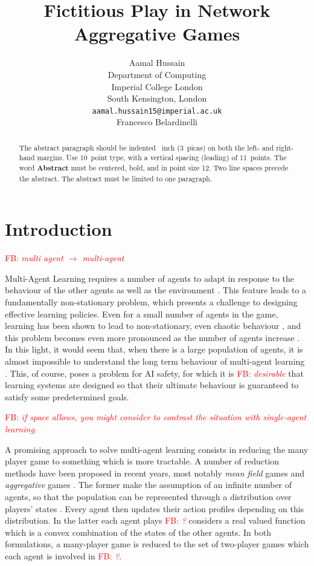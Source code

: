 \documentclass{article}
\title{Fictitious Play in Network Aggregative Games}
\author{%
 Aamal Hussain  \\
  Department of Computing\\
  Imperial College London\\
  South Kensington, London \\
  \texttt{aamal.hussain15@imperial.ac.uk} \\
  \And
  Francesco Belardinelli
}
\theoremstyle{definition}
\newcommand{\fb}[1]{\textcolor{red}{FB: \textit{#1}}}
\begin{document}
\maketitle

\begin{abstract}
  The abstract paragraph should be indented ~inch (3~picas) on
  both the left- and right-hand margins. Use 10~point type, with a vertical
  spacing (leading) of 11~points.  The word \textbf{Abstract} must be centered,
  bold, and in point size 12. Two line spaces precede the abstract. The abstract
  must be limited to one paragraph.
\end{abstract}

\section{Introduction}

\fb{multi agent $\to$ multi-agent}

Multi-Agent Learning requires a number of agents to adapt in response
to the behaviour of the other agents as well as the environment
\cite{Schwartz}. This feature leads to a fundamentally non-stationary
problem, which presents a challenge to designing effective learning
policies. Even for a small number of agents in the game,
learning has been shown to lead to non-stationary, even chaotic
behaviour \cite{SatoChaos}, and this problem becomes even more
pronounced as the number of agents increase \cite{Sanders}. In this
light, it would seem that, when there is a large population of agents,
it is almost impossible to understand the long term behaviour of multi-agent learning \cite{PiliourasChaoticMaps}. This, of course, poses a
problem for AI safety, for which it is \fb{desirable} that learning systems
are designed so that their ultimate behaviour is guaranteed to satisfy
some predetermined goals.

\fb{if space allows, you might consider to contrast the situation with
  single-agent learning.}

A promising approach to solve multi-agent learning
consists in reducing the many player game to something which is more
tractable. A number of reduction methods have been proposed in recent
years, most notably \emph{mean field} games \cite{} and \emph{aggregative}
games \cite{}. The former make the assumption of an infinite number of
agents, so that the population can be represented through a
distribution over players' states \cite{CainesPaper} . Every agent
then updates their action profiles depending on this distribution. In
the latter each agent plays \fb{?} considers a real valued function which is
a convex combination of the states of the other agents. In both
formulations, a many-player game is reduced to the set of two-player
games which each agent is involved in \fb{?}.
\end{document}
